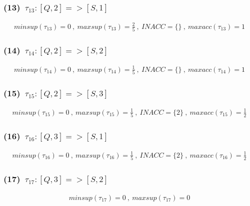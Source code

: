 \documentclass[a4paper,12pt]{jarticle}
\begin{document}
\subsubsection*{(13)~$\tau_{13}:[Q,2]=>[S,1]$}
\vspace{-4mm}
%
\begin{align*}
 minsup(\tau_{13})=0~,~maxsup(\tau_{13})=\frac{2}{5}~,~INACC=\{\}~,~maxacc(\tau_{13})=1
\end{align*}
%
\vspace{-10mm}
\subsubsection*{(14)~$\tau_{14}:[Q,2]=>[S,2]$}
\vspace{-4mm}
%
\begin{align*}
 minsup(\tau_{14})=0~,~maxsup(\tau_{14})=\frac{1}{5}~,~INACC=\{\}~,~maxacc(\tau_{14})=1
\end{align*}
%
\vspace{-10mm}
\subsubsection*{(15)~$\tau_{15}:[Q,2]=>[S,3]$}
\vspace{-4mm}
%
\begin{align*}
 minsup(\tau_{15})=0~,~maxsup(\tau_{15})=\frac{1}{5}~,~INACC=\{2\}~,~maxacc(\tau_{15})=\frac{1}{2}
\end{align*}
%
\vspace{-10mm}
\subsubsection*{(16)~$\tau_{16}:[Q,3]=>[S,1]$}
\vspace{-4mm}
%
\begin{align*}
 minsup(\tau_{16})=0~,~maxsup(\tau_{16})=\frac{1}{5}~,~INACC=\{2\}~,~maxacc(\tau_{16})=\frac{1}{2}
\end{align*}
%
\vspace{-10mm}
\subsubsection*{(17)~$\tau_{17}:[Q,3]=>[S,2]$}
\vspace{-4mm}
%
\begin{align*}
 minsup(\tau_{17})=0~,~maxsup(\tau_{17})=0
\end{align*}
%
\vspace{-10mm}
\end{document}
